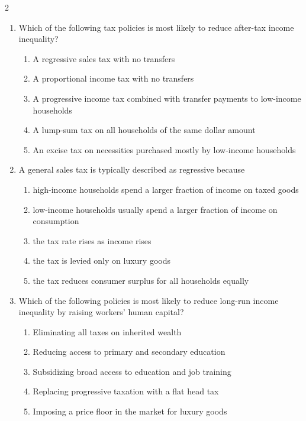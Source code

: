 \documentclass[10pt]{article}
\newenvironment{choiceslist}
  {\begin{enumerate}[label=(\Alph*), leftmargin=1.6em, itemsep=0.12em, topsep=0.18em, parsep=0pt]}
  {\end{enumerate}}
\begin{document}
\begin{multicols*}{2}
\begin{enumerate}[resume*=apq, leftmargin=*, itemsep=0.85em, topsep=0.2em, parsep=0pt]
\item Which of the following tax policies is most likely to reduce after-tax income inequality?
\begin{choiceslist}
\item A regressive sales tax with no transfers
\item A proportional income tax with no transfers
\item A progressive income tax combined with transfer payments to low-income households
\item A lump-sum tax on all households of the same dollar amount
\item An excise tax on necessities purchased mostly by low-income households
\end{choiceslist}
\item A general sales tax is typically described as regressive because
\begin{choiceslist}
\item high-income households spend a larger fraction of income on taxed goods
\item low-income households usually spend a larger fraction of income on consumption
\item the tax rate rises as income rises
\item the tax is levied only on luxury goods
\item the tax reduces consumer surplus for all households equally
\end{choiceslist}
\item Which of the following policies is most likely to reduce long-run income inequality by raising workers' human capital?
\begin{choiceslist}
\item Eliminating all taxes on inherited wealth
\item Reducing access to primary and secondary education
\item Subsidizing broad access to education and job training
\item Replacing progressive taxation with a flat head tax
\item Imposing a price floor in the market for luxury goods
\end{choiceslist}
\end{enumerate}
\end{multicols*}
\label{LastPage}
\end{document}
